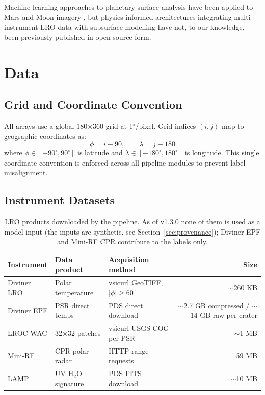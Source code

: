 \documentclass[12pt,a4paper]{article}
\begin{document}
Machine learning approaches to planetary surface analysis have been applied to Mars
and Moon imagery \citep{sato2014}, but physics-informed architectures integrating
multi-instrument LRO data with subsurface modelling have not, to our knowledge, been
previously published in open-source form.

\section{Data}

\subsection{Grid and Coordinate Convention}

All arrays use a global 180$\times$360 grid at 1$^\circ$/pixel. Grid indices
$(i, j)$ map to geographic coordinates as:
\begin{equation}
  \phi = i - 90, \qquad \lambda = j - 180
\end{equation}
where $\phi \in [-90^\circ, 90^\circ]$ is latitude and $\lambda \in [-180^\circ,
180^\circ]$ is longitude. This single coordinate convention is enforced across all
pipeline modules to prevent label misalignment.

\subsection{Instrument Datasets}

\begin{table}[H]
\centering
\caption{LRO products downloaded by the pipeline. As of v1.3.0 none of them
  is used as a model input (the inputs are synthetic, see
  Section~\ref{sec:provenance}); Diviner EPF and Mini-RF CPR contribute to the
  labels only.}
\label{tab:data}
\begin{tabular}{lllr}
\toprule
Instrument & Data product & Acquisition method & Size \\
\midrule
Diviner LRO  & Polar temperature     & vsicurl GeoTIFF, $|\phi| \geq 60^\circ$ & $\sim$260 KB\\
Diviner EPF  & PSR direct temps      & PDS direct download       & $\sim$2.7 GB compressed / $\sim$14 GB raw per crater \\
LROC WAC     & 32$\times$32 patches  & vsicurl USGS COG per PSR  & $\sim$1 MB  \\
Mini-RF      & CPR polar radar       & HTTP range requests       & 59 MB       \\
LAMP         & UV H$_2$O signature   & PDS FITS download         & $\sim$10 MB \\
\bottomrule
\end{tabular}
\end{table}
\end{document}
